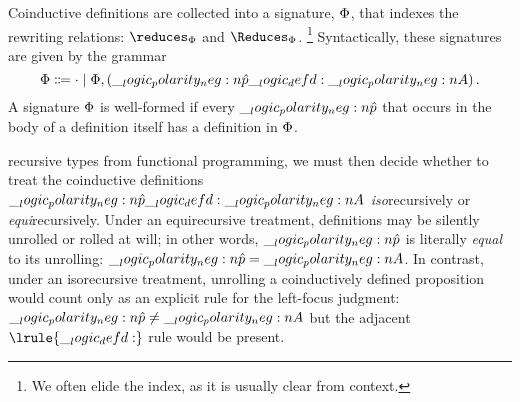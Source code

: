 

Coinductive definitions are collected into a signature, $\Phi$, that indexes the rewriting relations: $\reduces_{\orsig}$ and $\Reduces_{\orsig}$.%
\footnote{We often elide the index, as it is usually clear from context.}
Syntactically, these signatures are given by the grammar
\begin{equation*}
  \Phi \Coloneqq \cdot \mid \Phi, (\__logic_polarity_neg:n {\hat{p}} \__logic_defd: \__logic_polarity_neg:n {A})
  \,.
\end{equation*}
A signature $\Phi$ is well-formed if every $\__logic_polarity_neg:n {\hat{p}}$ that occurs in the body of a definition itself has a definition in $\Phi$.

 recursive types from functional programming\autocite{??}, we must then decide whether to treat the coinductive definitions $\__logic_polarity_neg:n {\hat{p}} \__logic_defd: \__logic_polarity_neg:n {A}$ \emph{iso}\-recursively or \emph{equi}\-recursively.
Under an equirecursive treatment, definitions may be silently unrolled or rolled at will;
in other words, $\__logic_polarity_neg:n {\hat{p}}$ is literally \emph{equal} to its unrolling: $\__logic_polarity_neg:n {\hat{p}} = \__logic_polarity_neg:n {A}$.
In contrast, under an isorecursive treatment, unrolling a coinductively defined proposition would count only as an explicit rule for the left-focus judgment: $\__logic_polarity_neg:n {\hat{p}} \neq \__logic_polarity_neg:n {A}$ but the adjacent $\lrule{\defd}$ rule would be present.%

